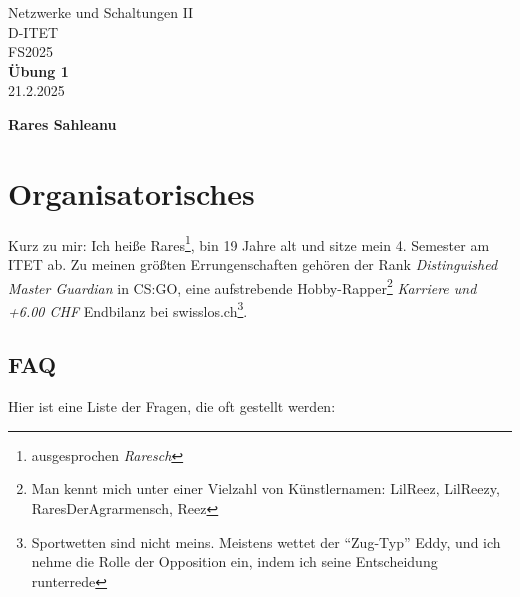 \documentclass[11pt,a4paper]{article}
\title{}
\date{}  %
\begin{document}
\begin{titlepage}
    \centering
    
    {\Huge Netzwerke und Schaltungen II}\\[0.8cm]
    {\Large D-ITET}\\[0.8cm]
    {\Large FS2025}\\[3.5cm]
    
    {\Huge \textbf{Übung 1}}\\[1cm]
    {\Large 21.2.2025}\\[3.5cm]


    \vfill
    {\Large \textbf{Rares Sahleanu}}
\end{titlepage}


\newpage
\pagestyle{fancy}  


\fancyfoot[L]{}  
\fancyfoot[C]{\thepage}
\fancyfoot[R]{}

\renewcommand{\headrulewidth}{0.4pt}  
\renewcommand{\footrulewidth}{0pt}  

\section{Organisatorisches}
Kurz zu mir: Ich heiße Rares\footnote{ausgesprochen \textit{Raresch} \textipa{['ra:r\esh]}}, bin 19 Jahre alt und sitze mein 4. Semester am ITET ab. Zu meinen größten Errungenschaften gehören der Rank \textit{Distinguished Master Guardian} in CS:GO, eine aufstrebende Hobby-Rapper\footnote{Man kennt mich unter einer Vielzahl von Künstlernamen: LilReez, LilReezy, RaresDerAgrarmensch, Reez} \textit{Karriere und +6.00 CHF} Endbilanz bei swisslos.ch\footnote{Sportwetten sind nicht meins. Meistens wettet der ``Zug-Typ'' Eddy, und ich nehme die Rolle der Opposition ein, indem ich seine Entscheidung runterrede}. 

\subsection{FAQ}
Hier ist eine Liste der Fragen, die oft gestellt werden:
\end{document}
